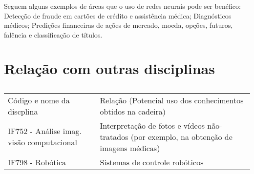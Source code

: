 \documentclass[10pt]{article}
\begin{document}
Seguem alguns exemplos de áreas que o uso de redes neurais pode ser benéfico: Detecção de fraude em cartões de crédito e assistência médica; Diagnósticos médicos; Predições financeiras de ações de mercado, moeda, opções, futuros, falência e classificação de títulos.

\section{Relação com outras disciplinas}

\begin{table}[h]
 \centering
 {\renewcommand\arraystretch{1.25}
 \caption{ }
 \begin{tabular}{ l l }
  \cline{1-1}\cline{2-2}  
    \multicolumn{1}{|p{3.850cm}|}{Código e nome da discplina \citep{disciplinas}   \centering } &
    \multicolumn{1}{p{4.217cm}|}{Relação (Potencial uso dos conhecimentos obtidos na cadeira) \centering }
  \\  
  \cline{1-1}\cline{2-2}  
    \multicolumn{1}{|p{3.850cm}|}{IF752 - Análise imag. visão computacional} &
    \multicolumn{1}{p{4.217cm}|}{ Interpretação de fotos e vídeos não-tratados (por exemplo, na obtenção de imagens médicas)}
  \\  
  \cline{1-1}\cline{2-2}  
    \multicolumn{1}{|p{3.850cm}|}{IF798 - Robótica} &
    \multicolumn{1}{p{4.217cm}|}{Sistemas de controle robóticos}
  \\  
  \hline

 \end{tabular} }
\end{table}




\end{document}
